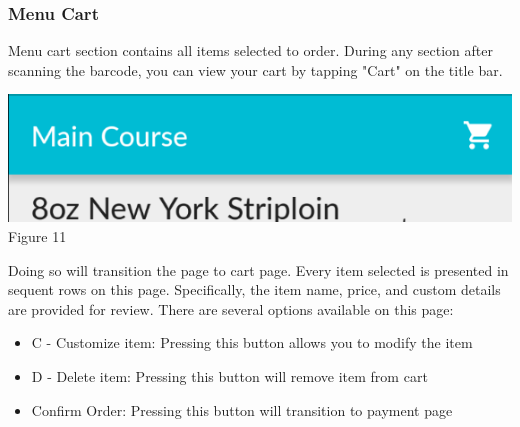 \documentclass[12pt, titlepage]{article}
\begin{document}
\subsubsection{Menu Cart}

Menu cart section contains all items selected to order. During any section after scanning the barcode, you can view your cart by tapping "Cart" on the title bar.
\begin{center}\includegraphics[scale=0.75]{titlebar.png}	\linebreak Figure 11\end{center}

\noindent Doing so will transition the page to cart page. Every item selected is presented in sequent rows on this page. Specifically, the item name, price, and custom details are provided for review. There are several options available on this page:

\begin{itemize}
  \item C - Customize item: Pressing this button allows  you to modify the item
  \item D - Delete item: Pressing this button will remove item from cart
  \item Confirm Order: Pressing this button will transition to payment page
\end{itemize}
\end{document}
